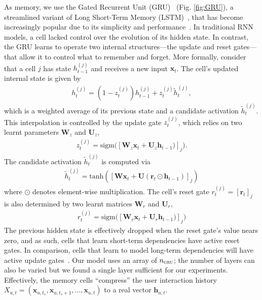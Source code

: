 \documentclass{sig-alternate-05-2015}
\newcommand{\mat}[1]{\mathbf{#1}}
\begin{document}
As memory, we use the Gated Recurrent Unit (GRU)~\cite{Cho2014} (Fig. \ref{fig:GRU}), a streamlined variant of Long Short-Term Memory (LSTM)~\cite{Hochreiter1997}, that has become increasingly popular due to its simplicity and performance~\cite{jozefowicz2015empirical}. In traditional RNN models, a cell lacked control over the evolution of its hidden state. In contrast, the GRU learns to operate two internal structures---the update and reset gates---that allow it to control what to remember and forget. More formally, consider that a cell $j$ has state $h_{t-1}^{(j)}$ and receives a new input $\mathbf{x}_t$. The cell's updated internal state is given by
\begin{align}
	h_t^{(j)} = (1-z_t^{(j)})h^{(j)}_{t-1} + z_t^{(j)}\tilde{h}_{t}^{(j)},
\end{align}
which is a weighted average of its previous state and a  candidate activation $\tilde{h}_{t}^{(j)}$. This interpolation is controlled by the update gate $z_t^{(j)}$, which relies on two learnt parameters $\mat{W}_z$ and $\mat{U}_z$,
\begin{align}
	z_t^{(j)} = \textrm{sigm}\big([\mat{W}_z\mat{x}_{t} + \mat{U}_z\mat{h}_{t-1})]_j\big).
\end{align}
The candidate activation $\tilde{h}_{t}^{(j)}$ is computed via
\begin{align}
	\tilde{h}_{t}^{(j)} = \mathrm{tanh}([\mat{W}\mat{x}_t + \mat{U}(\mat{r}_t \odot \mat{h}_{t-1})]_j )
\end{align}
where $\odot$ denotes element-wise multiplication. The cell's reset gate $r^{(j)}_t = [\mat{r}_t]_j$ is also determined by two learnt matrices $\mat{W}_r$ and $\mat{U}_r$,
\begin{align}
	r^{(j)}_t = \textrm{sigm}\big([\mat{W}_r\mat{x}_{t} + \mat{U}_r\mat{h}_{t-1})]_j\big)
\end{align}
The previous hidden state is effectively dropped when the reset gate's value nears zero, and as such, cells that learn short-term dependencies  have active reset gates. In comparison, cells that learn to model long-term dependencies will have active update gates~\cite{Cho2014}. Our model uses an array of $n_\textsc{gru}$; the number of layers can also be varied but we found a single layer sufficient for our experiments. Effectively, the memory cells ``compress'' the user interaction history $X_{u,t} = (\mat{x}_{u,t_s}, \mat{x}_{u,t_s + 1}, \dots, \mat{x}_{u,t})$ to a real vector $\mat{h}_{u,t}$.
\end{document}
